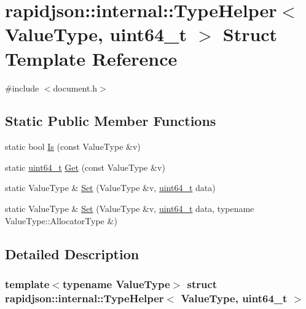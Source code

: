 \hypertarget{structrapidjson_1_1internal_1_1_type_helper_3_01_value_type_00_01uint64__t_01_4}{}\section{rapidjson\+::internal\+::Type\+Helper$<$ Value\+Type, uint64\+\_\+t $>$ Struct Template Reference}
\label{structrapidjson_1_1internal_1_1_type_helper_3_01_value_type_00_01uint64__t_01_4}


{\ttfamily \#include $<$document.\+h$>$}

\subsection*{Static Public Member Functions}
\begin{DoxyCompactItemize}
\item 
static bool \mbox{\hyperlink{structrapidjson_1_1internal_1_1_type_helper_3_01_value_type_00_01uint64__t_01_4_a139359bbe3d75e927fbcd0509e12fd87}{Is}} (const Value\+Type \&v)
\item 
static \mbox{\hyperlink{stdint_8h_aec6fcb673ff035718c238c8c9d544c47}{uint64\+\_\+t}} \mbox{\hyperlink{structrapidjson_1_1internal_1_1_type_helper_3_01_value_type_00_01uint64__t_01_4_a4688417a7adcc5f90a0a161adec088a2}{Get}} (const Value\+Type \&v)
\item 
static Value\+Type \& \mbox{\hyperlink{structrapidjson_1_1internal_1_1_type_helper_3_01_value_type_00_01uint64__t_01_4_ac16c03a1229998f3a0bdf7a2d7715981}{Set}} (Value\+Type \&v, \mbox{\hyperlink{stdint_8h_aec6fcb673ff035718c238c8c9d544c47}{uint64\+\_\+t}} data)
\item 
static Value\+Type \& \mbox{\hyperlink{structrapidjson_1_1internal_1_1_type_helper_3_01_value_type_00_01uint64__t_01_4_a4ad26bc0e14fac07902b617307fbb5a9}{Set}} (Value\+Type \&v, \mbox{\hyperlink{stdint_8h_aec6fcb673ff035718c238c8c9d544c47}{uint64\+\_\+t}} data, typename Value\+Type\+::\+Allocator\+Type \&)
\end{DoxyCompactItemize}


\subsection{Detailed Description}
\subsubsection*{template$<$typename Value\+Type$>$\newline
struct rapidjson\+::internal\+::\+Type\+Helper$<$ Value\+Type, uint64\+\_\+t $>$}



